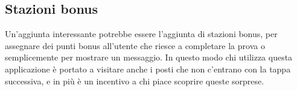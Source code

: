 	\subsection{Stazioni bonus}
		Un'aggiunta interessante potrebbe essere l'aggiunta di stazioni bonus, per assegnare dei punti bonus all'utente che riesce a completare la prova o semplicemente per mostrare un messaggio. In questo modo chi utilizza questa applicazione è portato a visitare anche i posti che non c'entrano con la tappa successiva, e in più è un incentivo a chi piace scoprire queste sorprese.
